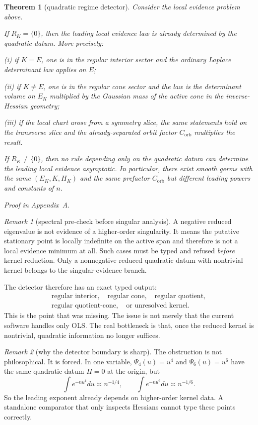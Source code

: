 \documentclass[11pt,a4paper]{article}
\numberwithin{equation}{section}
\theoremstyle{thmcompact}
\newtheorem{theorem}{Theorem}[section]
\theoremstyle{remark}
\newtheorem*{remarkplain}{Remark}
\newenvironment{remark}[1][]%
{\begin{remarkbox}\begin{remarkplain}[#1]\normalfont}
{\end{remarkplain}\end{remarkbox}}
\newcommand{\proofappendix}{\par{\hfill\scriptsize\emph{Proof in Appendix~A.}}\par}
\begin{document}
\begin{theorem}[quadratic regime detector]\label{thm:quadratic-detector}
Consider the local evidence problem above.

If $R_K=\{0\}$, then the leading local evidence law is already determined by the quadratic datum. More precisely:

(i) if $K=E$, one is in the regular interior sector and the ordinary Laplace determinant law applies on $E$;

(ii) if $K\neq E$, one is in the regular cone sector and the law is the determinant volume on $E_K$ multiplied by the Gaussian mass of the active cone in the inverse-Hessian geometry;

(iii) if the local chart arose from a symmetry slice, the same statements hold on the transverse slice and the already-separated orbit factor $C_{\mathrm{orb}}$ multiplies the result.

If $R_K\neq\{0\}$, then no rule depending only on the quadratic datum can determine the leading local evidence asymptotic. In particular, there exist smooth germs with the same $(E_K,K,H_K)$ and the same prefactor $C_{\mathrm{orb}}$ but different leading powers and constants of $n$.
\proofappendix
\end{theorem}

\begin{remark}[spectral pre-check before singular analysis]
A negative reduced eigenvalue is not evidence of a higher-order singularity. It means the putative stationary point is locally indefinite on the active span and therefore is not a local evidence minimum at all. Such cases must be typed and refused \emph{before} kernel reduction. Only a nonnegative reduced quadratic datum with nontrivial kernel belongs to the singular-evidence branch.
\end{remark}

The detector therefore has an exact typed output:
\[
\begin{gathered}
\text{regular interior},\quad
\text{regular cone},\quad
\text{regular quotient},\\
\text{regular quotient-cone},\quad
\text{or unresolved kernel}.
\end{gathered}
\]
This is the point that was missing. The issue is not merely that the current software handles only OLS. The real bottleneck is that, once the reduced kernel is nontrivial, quadratic information no longer suffices.

\begin{remark}[why the detector boundary is sharp]
The obstruction is not philosophical. It is forced. In one variable, $\Psi_4(u)=u^4$ and $\Psi_6(u)=u^6$ have the same quadratic datum $H=0$ at the origin, but
\[
\int e^{-n u^4}du \asymp n^{-1/4},
\qquad
\int e^{-n u^6}du \asymp n^{-1/6}.
\]
So the leading exponent already depends on higher-order kernel data. A standalone comparator that only inspects Hessians cannot type these points correctly.
\end{remark}
\end{document}
